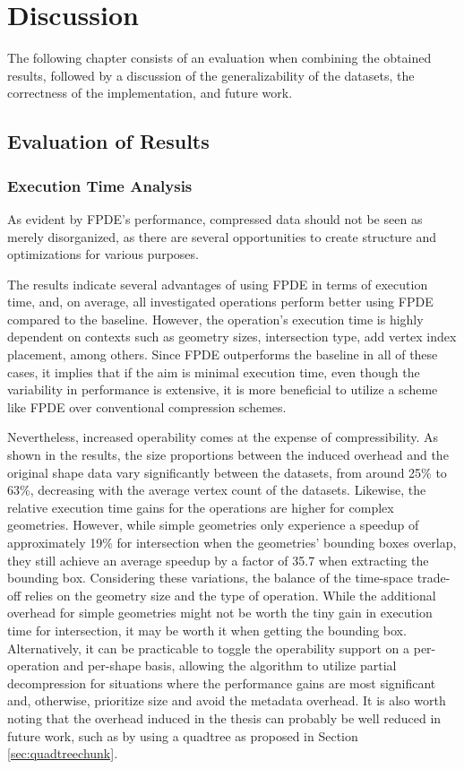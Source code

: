 \chapter{Discussion}
The following chapter consists of an evaluation when combining the obtained results, followed by a discussion of the generalizability of the datasets, the correctness of the implementation, and future work.
\section{Evaluation of Results}
\subsection{Execution Time Analysis}
As evident by FPDE's performance, compressed data should not be seen as merely disorganized, as there are several opportunities to create structure and optimizations for various purposes. 

The results indicate several advantages of using FPDE in terms of execution time, and, on average, all investigated operations perform better using FPDE compared to the baseline. However, the operation's execution time is highly dependent on contexts such as geometry sizes, intersection type, add vertex index placement, among others. Since FPDE outperforms the baseline in all of these cases, it implies that if the aim is minimal execution time, even though the variability in performance is extensive, it is more beneficial to utilize a scheme like FPDE over conventional compression schemes. 


Nevertheless, increased operability comes at the expense of compressibility. As shown in the results, the size proportions between the induced overhead and the original shape data vary significantly between the datasets, from around 25\% to 63\%, decreasing with the average vertex count of the datasets. Likewise, the relative execution time gains for the operations are higher for complex geometries. However, while simple geometries only experience a speedup of approximately 19\% for intersection when the geometries' bounding boxes overlap, they still achieve an average speedup by a factor of 35.7 when extracting the bounding box. Considering these variations, the balance of the time-space trade-off relies on the geometry size and the type of operation. While the additional overhead for simple geometries might not be worth the tiny gain in execution time for intersection, it may be worth it when getting the bounding box. Alternatively, it can be practicable to toggle the operability support on a per-operation and per-shape basis, allowing the algorithm to utilize partial decompression for situations where the performance gains are most significant and, otherwise, prioritize size and avoid the metadata overhead. It is also worth noting that the overhead induced in the thesis can probably be well reduced in future work, such as by using a quadtree as proposed in Section \ref{sec:quadtreechunk}.


